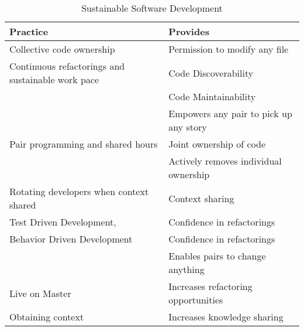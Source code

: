 \documentclass{sig-alternate-05-2015}
\begin{document}

%
%


%
%
\printccsdesc
















\begin{table*}[]
\renewcommand{\arraystretch}{1.3}
\centering
\caption{Sustainable Software Development}
\label{practices}
\begin{tabular}{p{3.0in}|p{3.5in}}
\hline
Practice       &     Provides \\
\hline
\hline
Collective code ownership  & Permission to modify any file \\    
\hline
Continuous refactorings and sustainable work pace  &  Code Discoverability \\    
                                                   &  Code Maintainability \\    
                                                   &  Empowers any pair to pick up any story \\                   
\hline
Pair programming and shared hours  &  Joint ownership of code \\                        
                                   &  Actively removes individual ownership \\                                  
\hline
Rotating developers when context shared  &  Context sharing \\  
\hline
Test Driven Development,  &  Confidence in refactorings \\   
Behavior Driven Development  &  Confidence in refactorings \\   
                             &  Enables pairs to change anything \\   
\hline
Live on Master & Increases refactoring opportunities\\
\hline
Obtaining context & Increases knowledge sharing \\
\hline
\end{tabular}
\end{table*}
\end{document}
